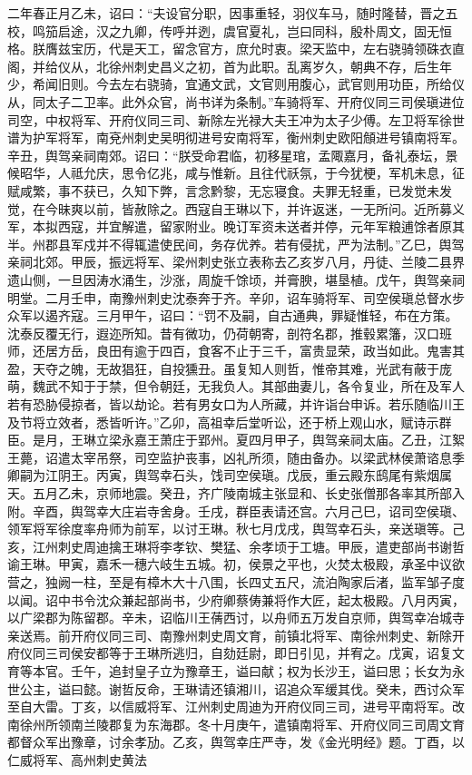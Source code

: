 \documentclass[]{article}
\begin{document}
二年春正月乙未，诏曰：``夫设官分职，因事重轻，羽仪车马，随时隆替，晋之五校，鸣笳启途，汉之九卿，传呼并迾，虞官夏礼，岂曰同科，殷朴周文，固无恒格。朕膺兹宝历，代是天工，留念官方，庶允时衷。梁天监中，左右骁骑领硃衣直阁，并给仪从，北徐州刺史昌义之初，首为此职。乱离岁久，朝典不存，后生年少，希闻旧则。今去左右骁骑，宜通文武，文官则用腹心，武官则用功臣，所给仪从，同太子二卫率。此外众官，尚书详为条制。''车骑将军、开府仪同三司侯瑱进位司空，中权将军、开府仪同三司、新除左光禄大夫王冲为太子少傅。左卫将军徐世谱为护军将军，南兗州刺史吴明彻进号安南将军，衡州刺史欧阳頠进号镇南将军。辛丑，舆驾亲祠南郊。诏曰：``朕受命君临，初移星琯，孟陬嘉月，备礼泰坛，景候昭华，人祗允庆，思令亿兆，咸与惟新。且往代祅氛，于今犹梗，军机未息，征赋咸繁，事不获已，久知下弊，言念黔黎，无忘寝食。夫罪无轻重，已发觉未发觉，在今昧爽以前，皆赦除之。西寇自王琳以下，并许返迷，一无所问。近所募义军，本拟西寇，并宜解遣，留家附业。晚订军资未送者并停，元年军粮逋馀者原其半。州郡县军戍并不得辄遣使民间，务存优养。若有侵扰，严为法制。''乙巳，舆驾亲祠北郊。甲辰，振远将军、梁州刺史张立表称去乙亥岁八月，丹徒、兰陵二县界遗山侧，一旦因涛水涌生，沙涨，周旋千馀顷，并膏腴，堪垦植。戊午，舆驾亲祠明堂。二月壬申，南豫州刺史沈泰奔于齐。辛卯，诏车骑将军、司空侯瑱总督水步众军以遏齐寇。三月甲午，诏曰：``罚不及嗣，自古通典，罪疑惟轻，布在方策。沈泰反覆无行，遐迩所知。昔有微功，仍荷朝寄，剖符名郡，推毂累籓，汉口班师，还居方岳，良田有逾于四百，食客不止于三千，富贵显荣，政当如此。鬼害其盈，天夺之魄，无故猖狂，自投獯丑。虽复知人则哲，惟帝其难，光武有蔽于庞萌，魏武不知于于禁，但令朝廷，无我负人。其部曲妻儿，各令复业，所在及军人若有恐胁侵掠者，皆以劫论。若有男女口为人所藏，并许诣台申诉。若乐随临川王及节将立效者，悉皆听许。''乙卯，高祖幸后堂听讼，还于桥上观山水，赋诗示群臣。是月，王琳立梁永嘉王萧庄于郢州。夏四月甲子，舆驾亲祠太庙。乙丑，江絮王薨，诏遣太宰吊祭，司空监护丧事，凶礼所须，随由备办。以梁武林侯萧谘息季卿嗣为江阴王。丙寅，舆驾幸石头，饯司空侯瑱。戊辰，重云殿东鸱尾有紫烟属天。五月乙未，京师地震。癸丑，齐广陵南城主张显和、长史张僧那各率其所部入附。辛酉，舆驾幸大庄岩寺舍身。壬戌，群臣表请还宫。六月己巳，诏司空侯瑱、领军将军徐度率舟师为前军，以讨王琳。秋七月戊戌，舆驾幸石头，亲送瑱等。己亥，江州刺史周迪擒王琳将李孝钦、樊猛、余孝顷于工塘。甲辰，遣吏部尚书谢哲谕王琳。甲寅，嘉禾一穗六岐生五城。初，侯景之平也，火焚太极殿，承圣中议欲营之，独阙一柱，至是有樟木大十八围，长四丈五尺，流泊陶家后渚，监军邹子度以闻。诏中书令沈众兼起部尚书，少府卿蔡俦兼将作大匠，起太极殿。八月丙寅，以广梁郡为陈留郡。辛未，诏临川王蒨西讨，以舟师五万发自京师，舆驾幸冶城寺亲送焉。前开府仪同三司、南豫州刺史周文育，前镇北将军、南徐州刺史、新除开府仪同三司侯安都等于王琳所逃归，自劾廷尉，即日引见，并宥之。戊寅，诏复文育等本官。壬午，追封皇子立为豫章王，谥曰献；权为长沙王，谥曰思；长女为永世公主，谥曰懿。谢哲反命，王琳请还镇湘川，诏追众军缓其伐。癸未，西讨众军至自大雷。丁亥，以信威将军、江州刺史周迪为开府仪同三司，进号平南将军。改南徐州所领南兰陵郡复为东海郡。冬十月庚午，遣镇南将军、开府仪同三司周文育都督众军出豫章，讨余孝劢。乙亥，舆驾幸庄严寺，发《金光明经》题。丁酉，以仁威将军、高州刺史黄法
\end{document}
